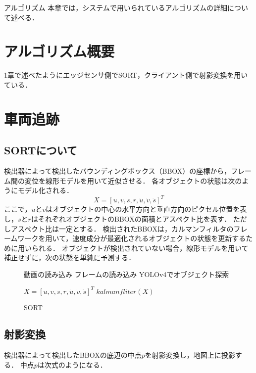 \chapterhead
{アルゴリズム}
{本章では，システムで用いられているアルゴリズムの詳細について述べる．}

\section{アルゴリズム概要}
1章で述べたようにエッジセンサ側でSORT，クライアント側で射影変換を用いている．

\section{車両追跡}
\subsection{SORTについて}
検出器によって検出したバウンディングボックス（BBOX）の座標から，フレーム間の変位を線形モデルを用いて近似させる．
各オブジェクトの状態は次のようにモデル化される．
\begin{equation}
  X = [u, v, s, r, \dot{u} , \dot{v} , \dot{s}]^T
\end{equation}
ここで，$u$と$v$はオブジェクトの中心の水平方向と垂直方向のピクセル位置を表し，$s$と$r$はそれぞれオブジェクトのBBOXの面積とアスペクト比を表す．
ただしアスペクト比は一定とする．
検出されたBBOXは，カルマンフィルタのフレームワークを用いて，速度成分が最適化されるオブジェクトの状態を更新するために用いられる．
オブジェクトが検出されていない場合，線形モデルを用いて補正せずに，次の状態を単純に予測する．

\begin{figure}[!t]
	\begin{algorithm}[H]
	    \caption{SORT}
	    \label{alg1}
	    \begin{algorithmic}[1]
	    \STATE 動画の読み込み
	    \WHILE{}
	    \STATE フレームの読み込み
	    \STATE YOLOv4でオブジェクト探索
	    
	    \STATE $X = [u, v, s, r, \dot{u} , \dot{v} , \dot{s}]^T$ 
	    \STATE $kalmanfliter(X)$
	    \ENDIF
	    \ENDWHILE
	    \end{algorithmic}
	\end{algorithm}
\end{figure}
      
      \subsection{射影変換}%
      検出器によって検出したBBOXの底辺の中点$p$を射影変換し，地図上に投影する．
      中点$p$は次式のようになる．

